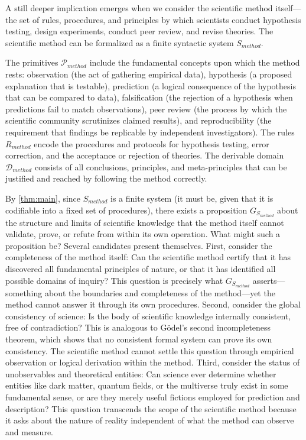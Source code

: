 \documentclass[11pt]{article}
\begin{document}
A still deeper implication emerges when we consider the scientific method itself—the set of rules, procedures, and principles by which scientists conduct hypothesis testing, design experiments, conduct peer review, and revise theories. The scientific method can be formalized as a finite syntactic system $S_{method}$.

The primitives $\mathcal{P}_{method}$ include the fundamental concepts upon which the method rests: observation (the act of gathering empirical data), hypothesis (a proposed explanation that is testable), prediction (a logical consequence of the hypothesis that can be compared to data), falsification (the rejection of a hypothesis when predictions fail to match observations), peer review (the process by which the scientific community scrutinizes claimed results), and reproducibility (the requirement that findings be replicable by independent investigators). The rules $R_{method}$ encode the procedures and protocols for hypothesis testing, error correction, and the acceptance or rejection of theories. The derivable domain $\mathcal{D}_{method}$ consists of all conclusions, principles, and meta-principles that can be justified and reached by following the method correctly.

By \ref{thm:main}, since $S_{method}$ is a finite system (it must be, given that it is codifiable into a fixed set of procedures), there exists a proposition $G_{S_{method}}$ about the structure and limits of scientific knowledge that the method itself cannot validate, prove, or refute from within its own operation. What might such a proposition be? Several candidates present themselves. First, consider the completeness of the method itself: Can the scientific method certify that it has discovered all fundamental principles of nature, or that it has identified all possible domains of inquiry? This question is precisely what $G_{S_{method}}$ asserts—something about the boundaries and completeness of the method—yet the method cannot answer it through its own procedures. Second, consider the global consistency of science: Is the body of scientific knowledge internally consistent, free of contradiction? This is analogous to Gödel's second incompleteness theorem, which shows that no consistent formal system can prove its own consistency. The scientific method cannot settle this question through empirical observation or logical derivation within the method. Third, consider the status of unobservables and theoretical entities: Can science ever determine whether entities like dark matter, quantum fields, or the multiverse truly exist in some fundamental sense, or are they merely useful fictions employed for prediction and description? This question transcends the scope of the scientific method because it asks about the nature of reality independent of what the method can observe and measure.
\end{document}
